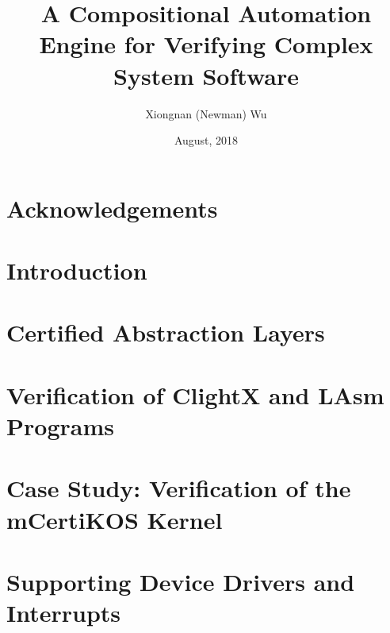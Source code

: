\documentclass[letterpaper,11pt]{yalephd}
\begin{document}
\title{A Compositional Automation Engine for Verifying Complex System Software}
\author{Xiongnan (Newman) Wu}
\date{August, 2018} 

\frontmatter

\begin{abstract}

\end{abstract}


\maketitle
{} %
\tableofcontents
\listoffigures %
\listoftables %

\chapter{Acknowledgements} %


\mainmatter

\chapter{Introduction}

\chapter{Certified Abstraction Layers}
\label{chapter:framework}


\chapter{Verification of ClightX and LAsm Programs}
\label{chapter:automation}


\chapter{Case Study: Verification of the mCertiKOS Kernel}
\label{chapter:sequential}


\chapter{Supporting Device Drivers and Interrupts}
\label{chapter:driver}
\end{document}
